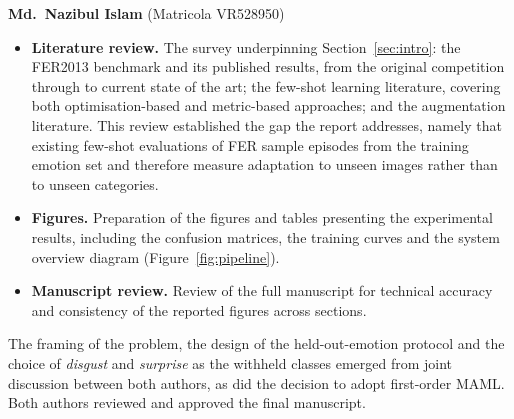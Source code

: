 \documentclass[11pt,a4paper]{article}
\begin{document}
\vspace{0.25cm}
\noindent
\textbf{Md.\ Nazibul Islam} (Matricola VR528950)

\begin{itemize}\itemsep2pt
\item \textbf{Literature review.} The survey underpinning
Section~\ref{sec:intro}: the FER2013 benchmark and its published results, from
the original competition through to current state of the art; the few-shot
learning literature, covering both optimisation-based and metric-based
approaches; and the augmentation literature. This review established the gap
the report addresses, namely that existing few-shot evaluations of FER sample
episodes from the training emotion set and therefore measure adaptation to
unseen images rather than to unseen categories.

\item \textbf{Figures.} Preparation of the figures and tables presenting the
experimental results, including the confusion matrices, the training curves and
the system overview diagram (Figure~\ref{fig:pipeline}).

\item \textbf{Manuscript review.} Review of the full manuscript for technical
accuracy and consistency of the reported figures across sections.
\end{itemize}

\vspace{0.25cm}
\noindent
The framing of the problem, the design of the held-out-emotion protocol and the
choice of \emph{disgust} and \emph{surprise} as the withheld classes emerged
from joint discussion between both authors, as did the decision to adopt
first-order MAML. Both authors reviewed and approved the final manuscript.
\end{document}
